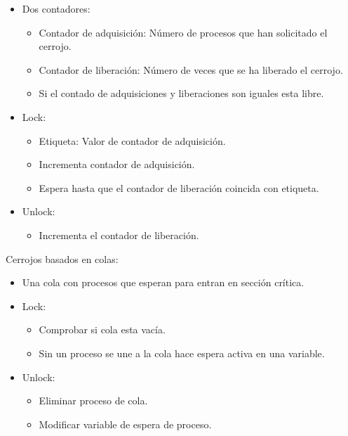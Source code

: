 \documentclass[12pt, twoside, openright]{report} %
\begin{document}
    \begin{itemize}
    
    \item
      Dos contadores:

      \begin{itemize}
      
      \item
        Contador de adquisición: Número de procesos que han solicitado
        el cerrojo.
      \item
        Contador de liberación: Número de veces que se ha liberado el
        cerrojo.
      \item
        Si el contado de adquisiciones y liberaciones son iguales esta
        libre.
      \end{itemize}
    \item
      Lock:

      \begin{itemize}
      
      \item
        Etiqueta: Valor de contador de adquisición.
      \item
        Incrementa contador de adquisición.
      \item
        Espera hasta que el contador de liberación coincida con
        etiqueta.
      \end{itemize}
    \item
      Unlock:

      \begin{itemize}
      
      \item
        Incrementa el contador de liberación.
      \end{itemize}
    \end{itemize}

    Cerrojos basados en colas:

    \begin{itemize}
    
    \item
      Una cola con procesos que esperan para entran en sección
      crítica.
    \item
      Lock:

      \begin{itemize}
      
      \item
        Comprobar si cola esta vacía.
      \item
        Sin un proceso se une a la cola hace espera activa en una
        variable.
      \end{itemize}
    \item
      Unlock:

      \begin{itemize}
      
      \item
        Eliminar proceso de cola.
      \item
        Modificar variable de espera de proceso.
      \end{itemize}
    \end{itemize}
\pagebreak
\end{document}
